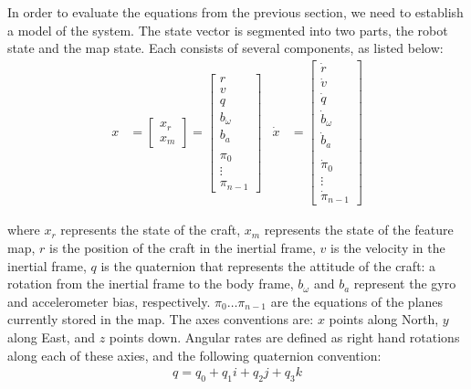 \documentclass[]{article}
\begin{document}
{In order to evaluate the equations from the previous section, we need to establish a model of the system. The state vector is segmented into two parts, the robot state and the map state. Each consists of several components, as listed below:
\begin{align}
	\label{eqn:state}
	x &=
	\left[
	\begin{matrix}
		x_r \\
		x_m
	\end{matrix}
	\right]
	=
	\left[
	\begin{matrix}
		r \\
		v \\
		q \\
		b_\omega \\
		b_a \\
		\\
		\pi_0 \\
		\vdots \\
		\pi_{n-1}
	\end{matrix}
	\right]
	&
	\dot{x} &= 
	\left[
	\begin{matrix}
		\dot{r} \\
		\dot{v} \\
		\dot{q} \\
		\dot{b}_\omega \\
		\dot{b}_a \\
		\\
		\dot{\pi}_0 \\
		\vdots \\
		\dot{\pi}_{n-1}
	\end{matrix}
	\right]
\end{align}

where $x_r$ represents the state of the craft, $x_m$ represents the state of the feature map, $r$ is the position of the craft in the inertial frame, $v$ is the velocity in the inertial frame, $q$ is the quaternion that represents the attitude of the craft: a rotation from the inertial frame to the body frame, $b_\omega$ and $b_a$ represent the gyro and accelerometer bias, respectively. $\pi_0 \hdots \pi_{n-1}$ are the equations of the planes currently stored in the map. The axes conventions are: $x$ points along North, $y$ along East, and $z$ points down. Angular rates are defined as right hand rotations along each of these axies, and the following quaternion convention:
\begin{align}
	\label{eqn:quaternion_components}
	q = q_0 + q_1i + q_2j + q_3k
\end{align}

}
\end{document}

